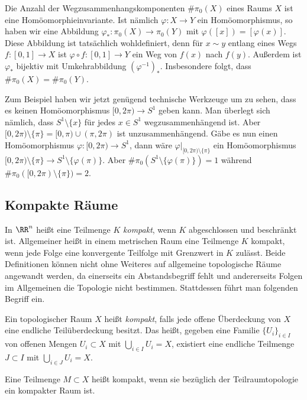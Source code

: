 Die Anzahl der Wegzusammenhangskomponenten $\#\pi_0(X)$ eines Raums $X$ ist eine Homöomorphieinvariante. Ist nämlich $\varphi\colon X\to Y$ ein Homöomorphismus, so haben wir eine Abbildung $\varphi_*\colon \pi_0(X)\to\pi_0(Y)$ mit $\varphi([x]) = [\varphi(x)]$. Diese Abbildung ist tatsächlich wohldefiniert, denn für $x\sim y$ entlang eines Wegs $f\colon [0,1]\to X$ ist $\varphi\circ f\colon [0,1]\to Y$ ein Weg von $f(x)$ nach $f(y)$. Außerdem ist $\varphi_*$ bijektiv mit Umkehrabbildung $(\varphi^{-1})_*$. Insbesondere folgt, dass $\#\pi_0(X) = \#\pi_0(Y)$.

Zum Beispiel haben wir jetzt genügend technische Werkzeuge um zu sehen, dass es keinen Homöomorphismus $[0,2\pi)\to S^1$ geben kann. Man überlegt sich nämlich, dass $S^1\setminus \{x\}$ für jedes $x\in S^1$ wegzusammenhängend ist. Aber $[0,2\pi)\setminus\{\pi\} = [0,\pi)\cup (\pi,2\pi)$ ist unzusammenhängend. Gäbe es nun einen Homöomorphismus $\varphi\colon [0,2\pi)\to S^1$, dann wäre $\varphi|_{[0,2\pi)\setminus\{\pi\}}$ ein Homöomorphismus $[0,2\pi)\setminus\{\pi\}\to S^1\setminus\{\varphi(\pi)\}$. Aber $\#\pi_0(S^1\setminus\{\varphi(\pi)\}) = 1$ während $\#\pi_0([0,2\pi)\setminus\{\pi\}) = 2$.

\subsection{Kompakte Räume}

In $\RR^n$ heißt eine Teilmenge $K$ \emph{kompakt}, wenn $K$ abgeschlossen und beschränkt ist. Allgemeiner heißt in einem metrischen Raum eine Teilmenge $K$ kompakt, wenn jede Folge eine konvergente Teilfolge mit Grenzwert in $K$ zulässt. Beide Definitionen können nicht ohne Weiteres auf allgemeine topologische Räume angewandt werden, da einerseits ein Abstandsbegriff fehlt und andererseits Folgen im Allgemeinen die Topologie nicht bestimmen. Stattdessen führt man folgenden Begriff ein.

\begin{definition}
Ein topologischer Raum $X$ heißt \emph{kompakt}, falls jede offene Überdeckung von $X$ eine endliche Teilüberdeckung besitzt. Das heißt, gegeben eine Familie $\{U_i\}_{i\in I}$ von offenen Mengen $U_i\subset X$ mit $\bigcup_{i\in I} U_i = X$, existiert eine endliche Teilmenge $J\subset I$ mit $\bigcup_{i\in J} U_i = X$.

Eine Teilmenge $M\subset X$ heißt kompakt, wenn sie bezüglich der Teilraumtopologie ein kompakter Raum ist.
\end{definition}

